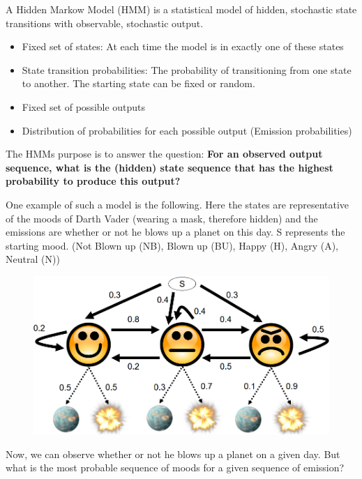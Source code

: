 \documentclass[
../../NLP4W_Summary.tex,
]
{subfiles}
\begin{document}
A Hidden Markow Model (HMM) is a statistical model of hidden, stochastic state transitions with observable, stochastic output. 

\begin{greenbox}
    \begin{itemize}
        \item Fixed set of states: At each time the model is in exactly one of these states
        \item State transition probabilities: The probability of transitioning from one state to another. The starting state can be fixed or random.
        \item Fixed set of possible outputs
        \item Distribution of probabilities for each possible output (Emission probabilities)
    \end{itemize}
    The HMMs purpose is to answer the question: \textbf{For an observed output sequence, what is the (hidden) state sequence that has the highest probability to produce this output?}
\end{greenbox}

One example of such a model is the following. Here the states are representative of the moods of Darth Vader (wearing a mask, therefore hidden) and the emissions are whether or not he blows up a planet on this day. S represents the starting mood. (Not Blown up (NB), Blown up (BU), Happy (H), Angry (A), Neutral (N))

\begin{figure}[htp]
    \centering
    \includegraphics[scale=0.35]{Pics/HMMExampleVader.png}
\end{figure}

Now, we can observe whether or not he blows up a planet on a given day. But what is the most probable sequence of moods for a given sequence of emission? 
\end{document}
